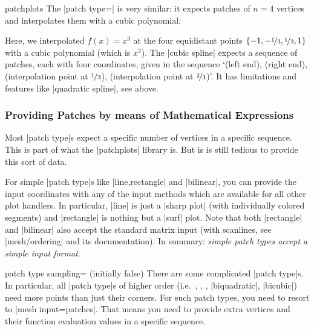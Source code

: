 {\begin{pgfplotslibrary}{patchplots}
	The |patch type=| is very similar: it expects patches of $n=4$ vertices and interpolates them with a cubic polynomial:
\begin{codeexample}[]
\end{codeexample}
	\noindent Here, we interpolated $f(x)=x^3$ at the four equidistant points $\{-1,-\nicefrac13,\nicefrac13,1\}$ with a cubic polynomial (which is $x^3$). The |cubic spline| expects a sequence of patches, each with four coordinates, given in the sequence `(left end), (right end), (interpolation point at $\nicefrac13$), (interpolation point at $\nicefrac23$)'. It has limitations and features like |quadratic spline|, see above.

\subsubsection{Providing Patches by means of Mathematical Expressions}
	Most |patch type|s expect a specific number of vertices in a specific sequence. This is part of what the |patchplots| library is. But is is still tedious to provide this sort of data.

	For simple |patch type|s like |line,rectangle| and |bilinear|, you can provide the input coordinates with any of the input methods which are available for all other plot handlers. In particular, |line| is just a |sharp plot| (with individually colored segments) and |rectangle| is nothing but a |surf| plot. Note that both |rectangle| and |bilinear| also accept the standard matrix input (with scanlines, see |mesh/ordering| and its documentation). In summary: \emph{simple patch types accept a simple input format}.

\begin{pgfplotskey}{patch type sampling= (initially false)}
	There are some complicated |patch type|s. In particular, all |patch type|s of higher order (i.e.\ , , , |biquadratic|, |bicubic|) need more points than just their corners. For such patch types, you need to resort to |mesh input=patches|. That means you need to provide extra vertices and their function evaluation values in a specific sequence.


\end{pgfplotskey}
\end{pgfplotslibrary}}
